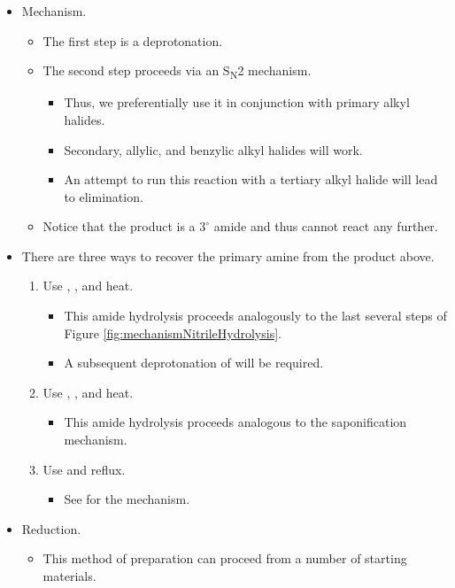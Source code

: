 \documentclass[../notes.tex]{subfiles}
\begin{document}
\begin{itemize}
    \item Mechanism.
    \begin{itemize}
        \item The first step is a deprotonation.
        \item The second step proceeds via an S\textsubscript{N}2 mechanism.
        \begin{itemize}
            \item Thus, we preferentially use it in conjunction with primary alkyl halides.
            \item Secondary, allylic, and benzylic alkyl halides will work.
            \item An attempt to run this reaction with a tertiary alkyl halide will lead to elimination.
        \end{itemize}
        \item Notice that the product is a $3^\circ$ amide and thus cannot react any further.
    \end{itemize}
    \item There are three ways to recover the primary amine from the product above.
    \begin{enumerate}
        \item Use , , and heat.
        \begin{itemize}
            \item This amide hydrolysis proceeds analogously to the last several steps of Figure \ref{fig:mechanismNitrileHydrolysis}.
            \item A subsequent deprotonation of  will be required.
        \end{itemize}
        \item Use , , and heat.
        \begin{itemize}
            \item This amide hydrolysis proceeds analogous to the saponification mechanism.
        \end{itemize}
        \item Use  and reflux.
        \begin{itemize}
            \item See \textcite{bib:SolomonsEtAl} for the mechanism.
        \end{itemize}
    \end{enumerate}
    \item Reduction.
    \begin{itemize}
        \item This method of preparation can proceed from a number of starting materials.

\end{itemize}
\end{itemize}
\end{document}
